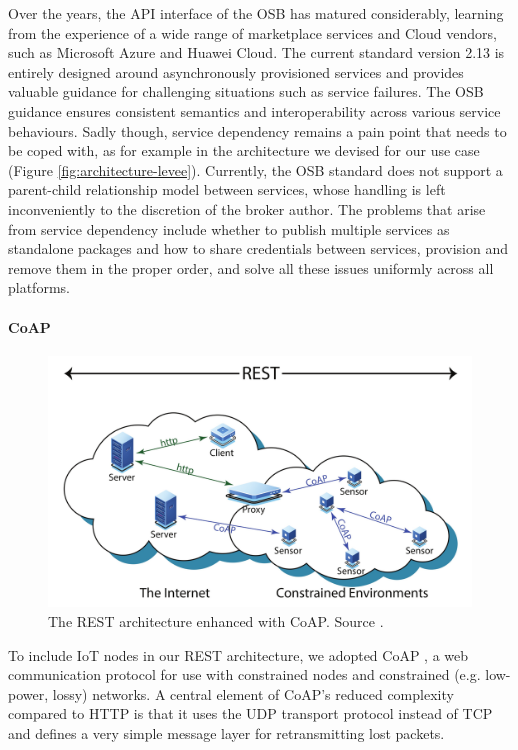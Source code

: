 Over the years, the API interface of the OSB has matured considerably, learning from the experience of a wide range of marketplace services and Cloud vendors, such as Microsoft Azure and Huawei Cloud. The current standard version 2.13 is entirely designed around asynchronously provisioned services and provides valuable guidance for challenging situations such as service failures. 
The OSB guidance ensures consistent semantics and interoperability across various service behaviours.
Sadly though, service dependency remains a pain point that needs to be coped with, as for example in the architecture we devised for our use case (Figure \ref{fig:architecture-levee}). 
Currently, the OSB standard does not support a parent-child relationship model between services, whose handling is left inconveniently to the discretion of the broker author. 
The problems that arise from service dependency include whether to publish multiple services as standalone packages and how to share credentials between services, provision and remove them in the proper order, and solve all these issues uniformly across all platforms.

\paragraph{CoAP}\label{sec:coap}

\begin{figure}[ht]
\centering
\includegraphics[width=\columnwidth]{figures/coap}
\caption{The REST architecture enhanced with CoAP. Source \cite{bormann2012coap}.}
\label{fig:coap}
\end{figure}

To include IoT nodes in our REST architecture, we adopted CoAP \cite{bormann2012coap}, a web communication protocol for use with constrained nodes and constrained (e.g. low-power, lossy) networks. A central element of CoAP's reduced complexity compared to HTTP is that it uses the UDP transport protocol instead of TCP and defines a very simple message layer for retransmitting lost packets.

